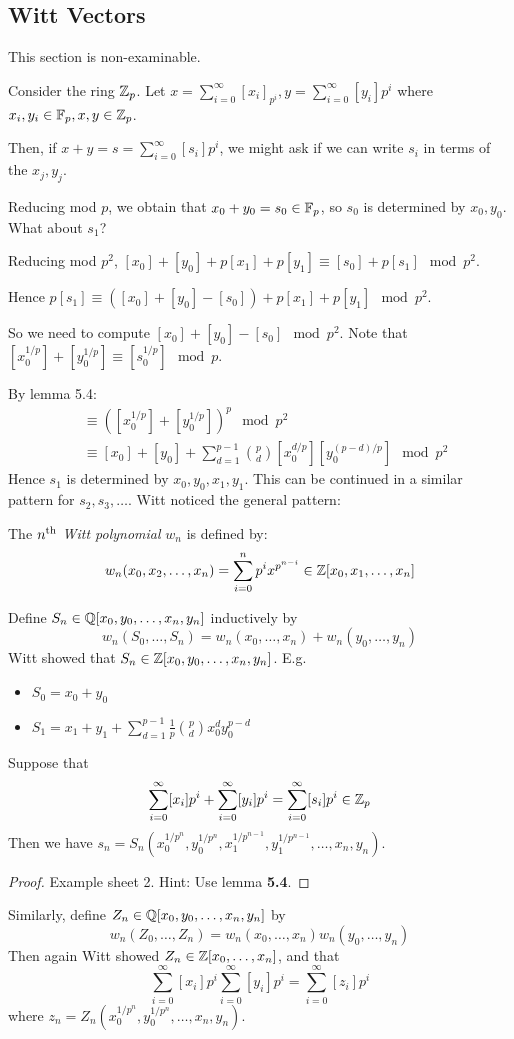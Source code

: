 \documentclass[10pt,a4paper]{article}
\begin{document}
\subsection{Witt Vectors}
This section is non-examinable.

Consider the ring $\mathbb{Z}_p$. Let $x = \sum_{i=0}^\infty [x_i]_{p^i}, y = \sum_{i=0}^\infty [y_i]p^i$ where $x_i, y_i \in \mathbb{F}_p, x,y \in \mathbb{Z}_p$.

Then, if $x+y = s = \sum_{i=0}^\infty [s_i]p^i$, we might ask if we can write $s_i$ in terms of the $x_j, y_j$.

Reducing mod $p$, we obtain that $x_0+y_0 = s_0 \in \mathbb{F}_p$, so $s_0$ is determined by $x_0, y_0$. What about $s_1$?

Reducing mod $p^2$, $[x_0] + [y_0] + p[x_1] + p[y_1] \equiv [s_0]+ p[s_1] \mod p^2$.

Hence $p[s_1] \equiv ([x_0]+[y_0]-[s_0]) +p[x_1]+p[y_1] \mod p^2$.

So we need to compute $[x_0]+[y_0]-[s_0] \mod p^2$. Note that $[x_0^{1/p}] + [y_0^{1/p}] \equiv [s_0^{1/p}] \mod p$.

By lemma 5.4:
\begin{align*}
  [s_0] &\equiv ([x_0^{1/p}]+[y_0^{1/p}])^p \mod p^2\\
  &\equiv [x_0]+[y_0] + \sum_{d=1}^{p-1}\binom{p}{d}[x_0^{d/p}][y_0^{(p-d)/p}] \mod p^2
\end{align*}
Hence $s_1$ is determined by $x_0, y_0, x_1, y_1$. This can be continued in a similar pattern for $s_2, s_3, \ldots$. Witt noticed the general pattern:
\begin{definition}
  The $n\textsuperscript{th}$ \emph{Witt polynomial} $w_n$ is defined by:
  \[w_n(x_0, x_2, \ldots, x_n) = \sum_{i=0}^n p^i x^{p^{n-i}} \in \mathbb{Z}[x_0, x_1, \ldots, x_n]\]
\end{definition}
Define $S_n \in \mathbb{Q}[x_0, y_0, \ldots, x_n, y_n]$ inductively by
\[w_n(S_0, \ldots, S_n) = w_n(x_0, \ldots, x_n) + w_n(y_0, \ldots, y_n)\]
Witt showed that $S_n \in \mathbb{Z}[x_0, y_0, \ldots, x_n, y_n]$.
E.g.
\begin{itemize}
  \item $S_0 = x_0+y_0$
  \item $S_1 = x_1+y_1 + \sum_{d=1}^{p-1}\frac{1}{p}\binom{p}{d}x_0^d y_0^{p-d}$
\end{itemize}
\begin{theorem}
  Suppose that
  \[ \sum_{i=0}^\infty [x_i]p^i + \sum_{i=0}^\infty [y_i]p^i = \sum_{i=0}^\infty [s_i]p^i \in \mathbb{Z}_p\]
  Then we have $s_n = S_n(x_0^{1/p^n}, y_0^{1/p^n}, x_1^{1/p^{n-1}}, y_1^{1/p^{n-1}}, \ldots, x_n, y_n)$.
\end{theorem}
\begin{proof}
  Example sheet 2. Hint: Use lemma \textbf{5.4}.
\end{proof}
Similarly, define $Z_n \in \mathbb{Q}[x_0, y_0, \ldots, x_n, y_n]$ by
\[w_n(Z_0, \ldots, Z_n) = w_n(x_0, \ldots, x_n)w_n(y_0, \ldots, y_n)\]
Then again Witt showed $Z_n \in \mathbb{Z}[x_0,\ldots, x_n]$, and that
\[\sum_{i=0}^\infty [x_i]p^i \sum_{i=0}^\infty [y_i]p^i = \sum_{i=0}^\infty [z_i]p^i\]
where $z_n = Z_n(x_0^{1/p^n}, y_0^{1/p^n}, \ldots, x_n, y_n)$.
\end{document}
